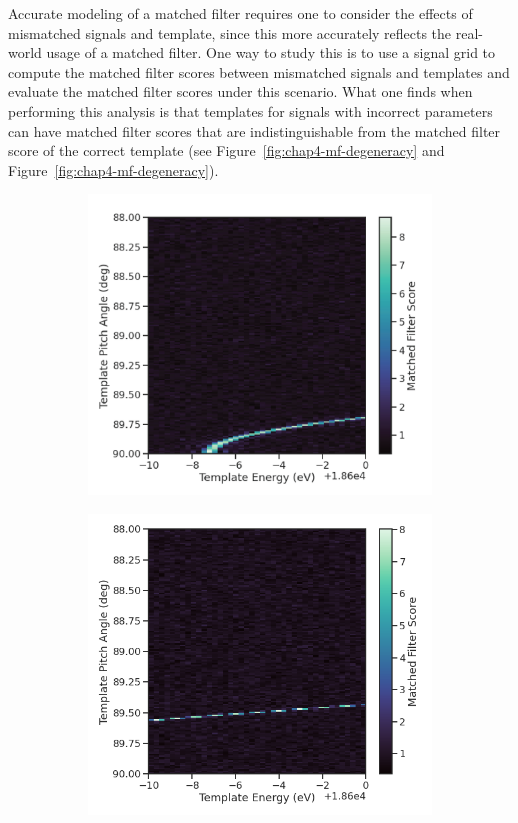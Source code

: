 Accurate modeling of a matched filter requires one to consider the effects of mismatched signals and template, since this more accurately reflects the real-world usage of a matched filter. One way to study this is to use a signal grid to compute the matched filter scores between mismatched signals and templates and evaluate the matched filter scores under this scenario. What one finds when performing this analysis is that templates for signals with incorrect parameters can have matched filter scores that are indistinguishable from the matched filter score of the correct template (see Figure~\ref{fig:chap4-mf-degeneracy} and Figure~\ref{fig:chap4-mf-degeneracy}).
\begin{figure}[htbp]
    \centering
    \begin{subfigure}{0.49\textwidth}
        \includegraphics[width=\textwidth]{figs/Chapter-4/230517_mf_degen_1.png}
        \caption{}
    \end{subfigure}
    \hfill
    \begin{subfigure}{0.49\textwidth}
        \includegraphics[width=\textwidth]{figs/Chapter-4/230517_mf_degen_2.png}

\end{subfigure}
\end{figure}
